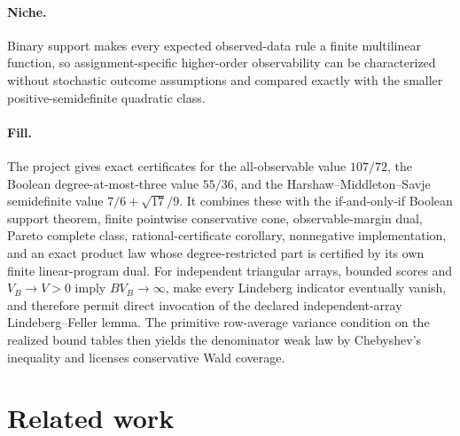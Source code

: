\documentclass{article}
\begin{document}
\paragraph{Niche.} Binary support makes every expected observed-data rule a finite multilinear function, so assignment-specific higher-order observability can be characterized without stochastic outcome assumptions and compared exactly with the smaller positive-semidefinite quadratic class.

\paragraph{Fill.} The project gives exact certificates for the all-observable value \(107/72\), the Boolean degree-at-most-three value \(55/36\), and the Harshaw--Middleton--Savje semidefinite value \(7/6+\sqrt{17}/9\). It combines these with the if-and-only-if Boolean support theorem, finite pointwise conservative cone, observable-margin dual, Pareto complete class, rational-certificate corollary, nonnegative implementation, and an exact product law whose degree-restricted part is certified by its own finite linear-program dual. For independent triangular arrays, bounded scores and \(V_B\to V>0\) imply \(B V_B\to\infty\), make every Lindeberg indicator eventually vanish, and therefore permit direct invocation of the declared independent-array Lindeberg--Feller lemma. The primitive row-average variance condition on the realized bound tables then yields the denominator weak law by Chebyshev's inequality and licenses conservative Wald coverage.

\section{Related work}
\end{document}
